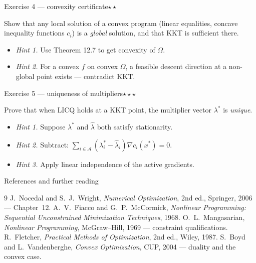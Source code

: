 \documentclass[aspectratio=169,10pt]{beamer}
\newcommand{\Aset}{\mathcal{A}}
\newcommand{\feas}{\Omega}
\newcommand{\grad}{\nabla}
\newcommand{\xs}{x^{*}}
\newcommand{\ls}{\lambda^{*}}
\newcommand{\stars}[1]{\textcolor{TLaccent}{#1}}
\begin{document}
\begin{frame}{Exercise 4 — convexity certificate}\hfill\stars{$\star\star$}

  Show that any local solution of a convex program (linear equalities, concave inequality functions
  $c_i$) is a \emph{global} solution, and that KKT is sufficient there.
  \begin{itemize}
    \item \emph{Hint 1.} Use Theorem 12.7 to get convexity of $\feas$.
    \item \emph{Hint 2.} For a convex $f$ on convex $\feas$, a feasible descent direction at a non-global point exists — contradict KKT.
  \end{itemize}
\end{frame}

\begin{frame}{Exercise 5 — uniqueness of multipliers}\hfill\stars{$\star\star\star$}

  Prove that when LICQ holds at a KKT point, the multiplier vector $\ls$ is \emph{unique}.
  \begin{itemize}
    \item \emph{Hint 1.} Suppose $\ls$ and $\hat\lambda$ both satisfy stationarity.
    \item \emph{Hint 2.} Subtract: $\sum_{i\in\Aset}(\lambda_i^{*}-\hat\lambda_i)\grad c_i(\xs)=0$.
    \item \emph{Hint 3.} Apply linear independence of the active gradients.
  \end{itemize}
\end{frame}


\begin{frame}{References and further reading}
  \begin{thebibliography}{9}
    \footnotesize
     J.~Nocedal and S.~J.~Wright, \emph{Numerical Optimization}, 2nd ed., Springer, 2006 — Chapter~12.
     A.~V.~Fiacco and G.~P.~McCormick, \emph{Nonlinear Programming: Sequential Unconstrained Minimization Techniques}, 1968.
     O.~L.~Mangasarian, \emph{Nonlinear Programming}, McGraw--Hill, 1969 — constraint qualifications.
     R.~Fletcher, \emph{Practical Methods of Optimization}, 2nd ed., Wiley, 1987.
     S.~Boyd and L.~Vandenberghe, \emph{Convex Optimization}, CUP, 2004 — duality and the convex case.
  \end{thebibliography}
\end{frame}
\end{document}
